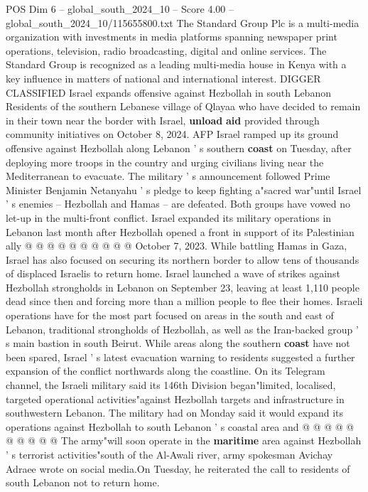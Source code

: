 \begin{textsample}{POS Dim 6 – global\_south\_2024\_10 – Score 4.00 – global\_south\_2024\_10/115655800.txt}  \label{ex:f6_pos_420}
The Standard Group Plc is a multi-media organization with investments in media platforms spanning newspaper print operations, television, radio broadcasting, digital and online services.
The Standard Group is recognized as a leading multi-media house in Kenya with a key influence in matters of national and international interest.
DIGGER CLASSIFIED Israel expands offensive against Hezbollah in south Lebanon Residents of the southern Lebanese village of Qlayaa who have decided to remain in their town near the border with Israel, \textbf{unload} \textbf{aid} provided through community initiatives on October 8, 2024.
AFP Israel ramped up its ground offensive against Hezbollah along Lebanon ' s southern \textbf{coast} on Tuesday, after deploying more troops in the country and urging civilians living near the Mediterranean to evacuate.
The military ' s announcement followed Prime Minister Benjamin Netanyahu ' s pledge to keep fighting a"sacred war"until Israel ' s enemies -- Hezbollah and Hamas -- are defeated.
Both groups have vowed no let-up in the multi-front conflict.
Israel expanded its military operations in Lebanon last month after Hezbollah opened a front in support of its Palestinian ally @ @ @ @ @ @ @ @ @ @ October 7, 2023.
While battling Hamas in Gaza, Israel has also focused on securing its northern border to allow tens of thousands of displaced Israelis to return home.
Israel launched a wave of strikes against Hezbollah strongholds in Lebanon on September 23, leaving at least 1,110 people dead since then and forcing more than a million people to flee their homes.
Israeli operations have for the most part focused on areas in the south and east of Lebanon, traditional strongholds of Hezbollah, as well as the Iran-backed group ' s main bastion in south Beirut.
While areas along the southern \textbf{coast} have not been spared, Israel ' s latest evacuation warning to residents suggested a further expansion of the conflict northwards along the coastline.
On its Telegram channel, the Israeli military said its 146th Division began"limited, localised, targeted operational activities"against Hezbollah targets and infrastructure in southwestern Lebanon.
The military had on Monday said it would expand its operations against Hezbollah to south Lebanon ' s coastal area and @ @ @ @ @ @ @ @ @ @ The army"will soon operate in the \textbf{maritime} area against Hezbollah ' s terrorist activities"south of the Al-Awali river, army spokesman Avichay Adraee wrote on social media.On Tuesday, he reiterated the call to residents of south Lebanon not to return home.

\end{textsample}
